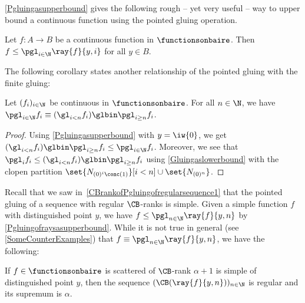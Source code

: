 
\cref{Pgluingasupperbound} gives the following rough -- yet very useful -- way to upper bound a continuous function using the pointed gluing operation.

\begin{corollary}\label{Pgluingofraysasupperbound}
Let $f:A\to B$ be a continuous function in $\functionsonbaire$.
Then $f\leq \pgl_{i\in \N}\ray{f}{y,i}$ for all $y\in B$.
\end{corollary}


The following corollary states another relationship of the pointed gluing with the finite gluing:

\begin{corollary}\label{SplittingaPgluingonatail}
Let $(f_i)_{i\in \N}$ be continuous in $\functionsonbaire$.
For all $n\in\N$, we have $\pgl_{i\in\N}f_i\equiv(\gl_{i<n}f_i)\glbin \pgl_{i\geq n}f_{i}$.
\end{corollary}
\begin{proof}
Using \cref{Pgluingasupperbound} with $y=\iw{0}$, we get $(\gl_{i<n}f_i)\glbin \pgl_{i\geq n}f_{i}  \leq \pgl_{i\in \N} f_i$.
Moreover, we see that  $\pgl_i f_i\leq (\gl_{i<n}f_i)\glbin \pgl_{i\geq n}f_{i}$ using \cref{Gluingaslowerbound} with the clopen partition $\set{N_{(0)^i\conc(1)}}[i<n]\cup\set{N_{(0)^n}}$.
\end{proof}

Recall that we saw in~\cref{CBrankofPgluingofregularsequence1} that the pointed gluing of a sequence with regular $\CB$-ranks is simple. Given a simple function $f$ with distinguished point $y$, we have $f\leq \pgl_{n\in\N} \ray{f}{y,n}$ by \cref{Pgluingofraysasupperbound}. While it is not true in general (see \cref{SomeCounterExamples}) that $f\equiv \pgl_{n\in\N} \ray{f}{y,n}$, we have the following:

\begin{proposition}\label{CBrankofPgluingofregularsequence2simple}
If $f\in\functionsonbaire$ is scattered of $\CB$-rank $\alpha+1$ is simple of distinguished point $y$, then the sequence $(\CB(\ray{f}{y,n}))_{n\in\N}$ is regular and its supremum is $\alpha$. 
\end{proposition}


